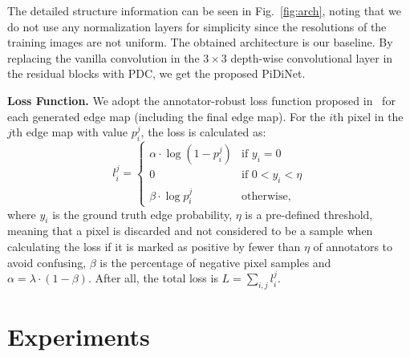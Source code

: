 \documentclass[10pt,twocolumn,letterpaper]{article}
\begin{document}
The detailed structure information can be seen in Fig.~\ref{fig:arch}, noting that we do not use any normalization layers for simplicity since the resolutions of the training images are not uniform. The obtained architecture is our baseline. By replacing the vanilla convolution in the $3\times 3$ depth-wise convolutional layer in the residual blocks with PDC, we get the proposed PiDiNet.

\vspace{0.3em}
\noindent \textbf{Loss Function.} \quad We adopt the annotator-robust loss function proposed in~\cite{liu2019richer} for each generated edge map (including the final edge map). For the $i$th pixel in the $j$th edge map with value $p_i^j$, the loss is calculated as:
{\small \begin{equation}
    l_i^j = \begin{cases} 
    \alpha\cdot \log (1 - p_i^j) &\text{if } y_i  = 0 \\
    0 &\text{if } 0 < y_i < \eta \\
    \beta\cdot \log p_i^j &\text{otherwise},
    \end{cases}
\end{equation}}
where $y_i$ is the ground truth edge probability, $\eta$ is a pre-defined threshold, meaning that a pixel is discarded and not considered to be a sample when calculating the loss if it is marked as positive by fewer than $\eta$ of annotators to avoid confusing, $\beta$ is the percentage of negative pixel samples and $\alpha = \lambda\cdot (1-\beta)$. After all, the total loss is $L = \sum_{i,j}l_i^j$.


\section{Experiments}
\label{sec:experiments}
\end{document}
